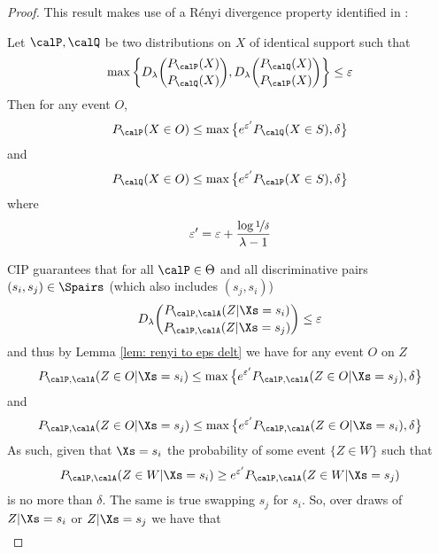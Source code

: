 \begin{proof}
	This result makes use of a R\'enyi divergence property identified in \cite{renyi}: 
	\begin{lemma}
		\label{lem: renyi to eps delt}
		Let $\calP,\calQ$ be two distributions on $X$ of identical support such that  
		\begin{align*}
			\max \bigg\{ D_\lambda \binom{P_\calP(X)}{P_\calQ(X)}, 
			D_\lambda \binom{P_\calQ(X)}{P_\calP(X)} \bigg\}
			\leq \varepsilon 
		\end{align*}
		Then for any event $O$,
		\begin{align*}
			P_\calP(X \in O) \leq \max \big\{ e^{\varepsilon'} P_\calQ(X \in S), \delta \big\}
		\end{align*} 
		and
		\begin{align*}
			P_\calQ(X \in O) \leq \max \big\{ e^{\varepsilon'} P_\calP(X \in S), \delta \big\}
		\end{align*} 
		where 
		\begin{align*}
			\varepsilon' = \varepsilon + \frac{\log \nicefrac{1}{\delta}}{\lambda - 1}
		\end{align*}
	\end{lemma}
	CIP guarantees that for all $\calP \in \Theta$ and all discriminative pairs $(s_i, s_j) \in \Spairs$ (which also includes $(s_j, s_i)$) 
	\begin{align*}
		D_\lambda \binom{P_{\calP, \calA}(Z | \Xs = s_i)}{P_{\calP,\calA}(Z | \Xs = s_j)} \leq \varepsilon
	\end{align*}
	and thus by Lemma \ref{lem: renyi to eps delt} we have for any event $O$ on $Z$
	\begin{align*}
		P_{\calP, \calA}(Z \in O | \Xs = s_i) 
		\leq \max \big\{ e^{\varepsilon'} P_{\calP, \calA}(Z \in O | \Xs = s_j), \delta \big\}
	\end{align*}
	and
	\begin{align*}
		P_{\calP, \calA}(Z \in O | \Xs = s_j) 
		\leq \max \big\{ e^{\varepsilon'} P_{\calP, \calA}(Z \in O | \Xs = s_i), \delta \big\}
	\end{align*}
	As such, given that $\Xs = s_i$ the probability of some event $\{Z \in W\}$ such that 
	\begin{align*}
		P_{\calP, \calA}(Z \in W | \Xs = s_i) 
		\geq  e^{\varepsilon'} P_{\calP, \calA}(Z \in W | \Xs = s_j)
	\end{align*}
	is no more than $\delta$. The same is true swapping $s_j$ for $s_i$. So, over draws of $Z | \Xs = s_i$ or $Z | \Xs = s_j$ we have that 
	\begin{align*}

\end{align*}
\end{proof}

